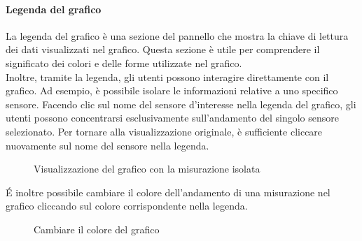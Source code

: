 \paragraph{Legenda del grafico}
La legenda del grafico è una sezione del pannello che mostra la chiave di lettura dei dati visualizzati nel grafico. Questa sezione è utile per comprendere il significato dei colori e delle forme utilizzate nel grafico.\\
Inoltre, tramite la legenda, gli utenti possono interagire direttamente con il grafico. Ad esempio, è possibile isolare le informazioni relative a uno specifico sensore. Facendo clic sul nome del sensore d'interesse nella legenda del grafico, gli utenti possono concentrarsi esclusivamente sull'andamento del singolo sensore selezionato. Per tornare alla visualizzazione originale, è sufficiente cliccare nuovamente sul nome del sensore nella legenda.
\begin{figure}[H]
    \centering
    \caption{Visualizzazione del grafico con la misurazione isolata}
    \label{fig:my_label}
\end{figure}
É inoltre possibile cambiare il colore dell'andamento di una misurazione nel grafico cliccando sul colore corrispondente nella legenda.
\begin{figure}[H]
    \centering
    \caption{Cambiare il colore del grafico}
    \label{fig:my_label}
\end{figure}


